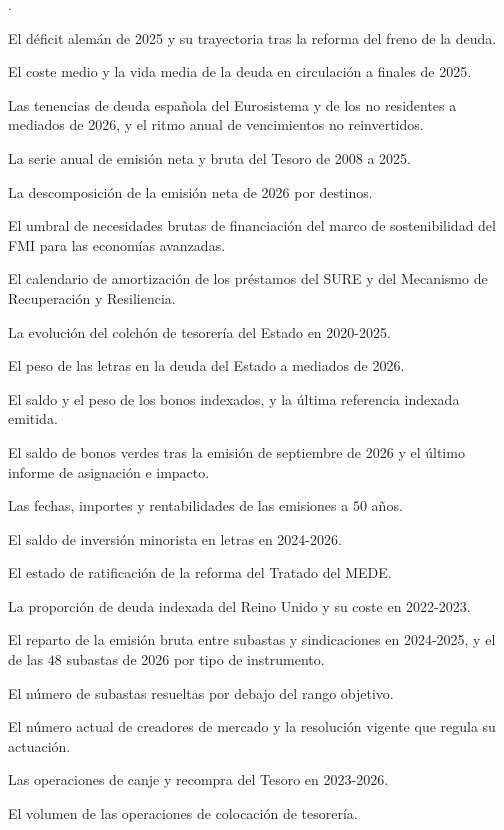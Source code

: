 \documentclass[10pt,a4paper]{article}
\newcounter{numitem}
\newenvironment{lnum}
      {\begin{list}{\arabic{numitem}.}{%
          \usecounter{numitem}%
          \setlength{\leftmargin}{1cm}%
          \setlength{\parskip}{3pt}%
          \setlength{\itemsep}{0pt}%
          \setlength{\parsep}{0pt}%
      }}
      {\end{list}}
\begin{document}
\begin{lnum}
    \item El déficit alemán de 2025 y su trayectoria tras la reforma del freno de la deuda.
    \item El coste medio y la vida media de la deuda en circulación a finales de 2025.
    \item Las tenencias de deuda española del Eurosistema y de los no residentes a mediados de 2026, y el ritmo anual de vencimientos no reinvertidos.
    \item La serie anual de emisión neta y bruta del Tesoro de 2008 a 2025.
    \item La descomposición de la emisión neta de 2026 por destinos.
    \item El umbral de necesidades brutas de financiación del marco de sostenibilidad del FMI para las economías avanzadas.
    \item El calendario de amortización de los préstamos del SURE y del Mecanismo de Recuperación y Resiliencia.
    \item La evolución del colchón de tesorería del Estado en 2020-2025.
    \item El peso de las letras en la deuda del Estado a mediados de 2026.
    \item El saldo y el peso de los bonos indexados, y la última referencia indexada emitida.
    \item El saldo de bonos verdes tras la emisión de septiembre de 2026 y el último informe de asignación e impacto.
    \item Las fechas, importes y rentabilidades de las emisiones a $50$ años.
    \item El saldo de inversión minorista en letras en 2024-2026.
    \item El estado de ratificación de la reforma del Tratado del MEDE.
    \item La proporción de deuda indexada del Reino Unido y su coste en 2022-2023.
    \item El reparto de la emisión bruta entre subastas y sindicaciones en 2024-2025, y el de las $48$ subastas de 2026 por tipo de instrumento.
    \item El número de subastas resueltas por debajo del rango objetivo.
    \item El número actual de creadores de mercado y la resolución vigente que regula su actuación.
    \item Las operaciones de canje y recompra del Tesoro en 2023-2026.
    \item El volumen de las operaciones de colocación de tesorería.

\end{lnum}
\end{document}
